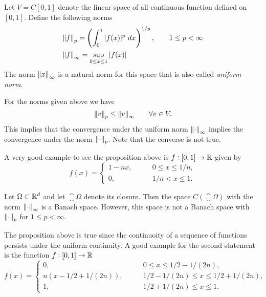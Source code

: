 \begin{summary}
	Let $ V = C[0,1] $ denote the linear space of all continuous function defined on $ [0,1] $. Define the following norms
	\begin{align*}
		& \norm{f}_p = \left(  \int_{0}^{1} |f(x)|^p\ dx \right)^{1/p}, \qquad 1\leq p < \infty \\
		& \norm{f}_\infty = \sup_{0\leq x\leq 1} |f(x)|
	\end{align*}
	The norm $ \norm{x}_\infty $ is a natural norm for this space that is also called \emph{uniform norm}.
	\begin{proposition}
		For the norms given above we have
		\[ \norm{v}_{p} \leq \norm{v}_\infty \qquad \forall v \in V. \]
		This implies that the convergence under the uniform norm $ \norm{\cdot}_\infty $ implies the convergence under the norm $ \norm{\cdot}_p $. Note that the converse is not true.
	\end{proposition}
	\begin{remark}
		A very good example to see the proposition above is $ f:[0,1]\to \mathbb{R} $ given by
		\[ f(x) = \begin{cases}
			1-nx, &\qquad 0\leq x\leq 1/n,\\
			0, &\qquad 1/n < x \leq 1.
		\end{cases} \]
	\end{remark}
	\begin{proposition}
		Let $ \Omega \subset \mathbb{R}^d $ and let $ \closure{\Omega} $ denote its closure. Then the space $ C(\closure{\Omega}) $ with the norm $ \norm{\cdot}_\infty $ is a Banach space. However, this space is not a Banach space with $ \norm{\cdot}_p $ for $ 1\leq p < \infty $.
	\end{proposition}
	\begin{remark}
		The proposition above is true since the continuoity of a sequence of functions persists under the uniform continuity. A good example for the second statement is the function $ f: [0,1] \to \mathbb{R} $
		\[ 
		f(x) = \begin{cases}
			0, &\qquad 0\leq x\leq 1/2 - 1/(2n),\\
			n(x-1/2+1/(2n)), &\qquad 1/2-1/(2n) \leq x \leq 1/2+1/(2n), \\
			1, &\qquad 1/2 + 1/(2n) \leq x \leq 1.
		\end{cases}
		 \]
	\end{remark}
\end{summary}

